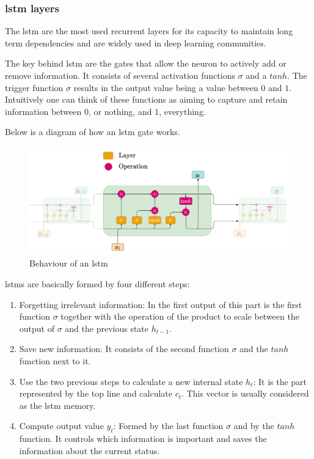 \subsubsection{\acrshort{lstm} layers}\label{lstm_theory}

The \acrfull{lstm} are the most used recurrent layers for its capacity to maintain long term dependencies and are widely used in deep learning communities.
\newline

The key behind \acrshort{lstm} are the gates that allow the neuron to actively add or remove information. It consists of several activation functions $\sigma$ and a $tanh$. The trigger function $\sigma$ results in the output value being a value between $0$ and $1$. Intuitively one can think of these functions as aiming to capture and retain information between $0$, or nothing, and $1$, everything.
\newline

Below is a diagram of how an \acrshort{lstm} gate works.

\begin{figure}[H]
    \centering
    \includegraphics[width=16cm]{images/state-of-art/rnn/lstm.png}
    \caption{Behaviour of an \acrshort{lstm}}
\end{figure}


\acrshort{lstm}s are basically formed by four different steps:
\begin{enumerate}
    \item Forgetting irrelevant information: In the first output of this part is the first function $\sigma$ together with the operation of the product to scale between the output of $\sigma$ and the previous state $h_{t-1}$.
    \item Save new information: It consists of the second function $\sigma$ and the $tanh$ function next to it.
    \item Use the two previous steps to calculate a new internal state $h_t$: It is the part represented by the top line and calculate $c_t$. This vector is usually considered as the \acrshort{lstm} memory.
    \item Compute output value $y_t$: Formed by the last function $\sigma$ and by the $tanh$ function. It controls which information is important and saves the information about the current status.
\end{enumerate}

